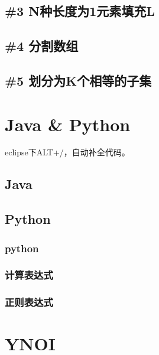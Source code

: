 \documentclass[twoside,a4paper]{article}
\begin{document}
\subsection{\#3 N种长度为1元素填充L}


\subsection{\#4 分割数组}


\subsection{\#5 划分为K个相等的子集}



\section{Java \& Python}
eclipse下ALT+/，自动补全代码。

\subsection{Java}



\subsection{Python}
\subsubsection{python}

\subsubsection{计算表达式}

\subsubsection{正则表达式}



\section{YNOI}
\end{document}
